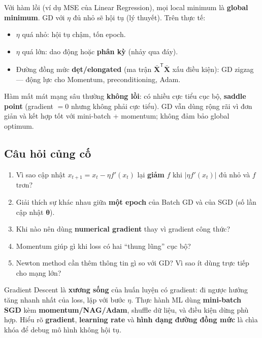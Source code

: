 \begin{dongco}[title={Hàm lồi (convex) và tại sao LR quan trọng}]
Với hàm lồi (ví dụ MSE của Linear Regression), mọi local minimum là \textbf{global minimum}. GD với $\eta$ đủ nhỏ sẽ hội tụ (lý thuyết). Trên thực tế:
\begin{itemize}
  \item $\eta$ quá nhỏ: hội tụ chậm, tốn epoch.
  \item $\eta$ quá lớn: dao động hoặc \textbf{phân kỳ} (nhảy qua đáy).
  \item Đường đồng mức \textbf{dẹt/elongated} (ma trận $\bar{\mathbf{X}}^{\mathsf{T}}\bar{\mathbf{X}}$ xấu điều kiện): GD zigzag --- động lực cho Momentum, preconditioning, Adam.
\end{itemize}
\end{dongco}

\begin{luuy}[title={Saddle point và non-convex}]
Hàm mất mát mạng sâu thường \textbf{không lồi}: có nhiều cực tiểu cục bộ, \textbf{saddle point} (gradient $=0$ nhưng không phải cực tiểu). GD vẫn dùng rộng rãi vì đơn giản và kết hợp tốt với mini-batch + momentum; không đảm bảo global optimum.
\end{luuy}

\subsection{Câu hỏi củng cố}

\begin{phuongphap}[title={Tự kiểm tra}]
\begin{enumerate}
  \item Vì sao cập nhật $x_{t+1} = x_t - \eta f'(x_t)$ lại \textbf{giảm} $f$ khi $|\eta f'(x_t)|$ đủ nhỏ và $f$ trơn?
  \item Giải thích sự khác nhau giữa \textbf{một epoch} của Batch GD và của SGD (số lần cập nhật $\boldsymbol{\theta}$).
  \item Khi nào nên dùng \textbf{numerical gradient} thay vì gradient công thức?
  \item Momentum giúp gì khi loss có hai ``thung lũng'' cục bộ?
  \item Newton method cần thêm thông tin gì so với GD? Vì sao ít dùng trực tiếp cho mạng lớn?
\end{enumerate}
\end{phuongphap}

\begin{tongket}[title={Tóm tắt chương}]
Gradient Descent là \textbf{xương sống} của huấn luyện có gradient: đi ngược hướng tăng nhanh nhất của loss, lặp với bước $\eta$. Thực hành ML dùng \textbf{mini-batch SGD} kèm \textbf{momentum/NAG/Adam}, shuffle dữ liệu, và điều kiện dừng phù hợp. Hiểu rõ \textbf{gradient}, \textbf{learning rate} và \textbf{hình dạng đường đồng mức} là chìa khóa để debug mô hình không hội tụ.
\end{tongket}
